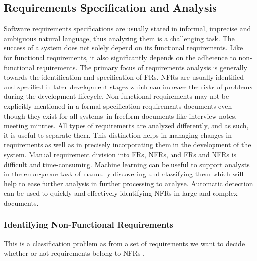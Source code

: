 \subsection{Requirements Specification and Analysis}

Software requirements specifications are usually stated in informal, imprecise and ambiguous natural language, thus analyzing them is a challenging task. 
The success of a system does not solely depend on its functional requirements.
Like for functional requirements, it also significantly depends on the adherence
to non-functional requirements. The primary focus of requirements analysis is
generally towards the identification and specification of FRs. NFRs are usually
identified and specified in later development stages which can increase the
risks of problems during the development lifecycle. Non-functional requirements may not be explicitly mentioned in a formal
specification requirements documents even though they exist for all
systems~\cite{Slankas:2013}in freeform documents like interview notes,
meeting minutes.
All types of requirements are analyzed differently, and as such, it is
useful to separate them. This distinction helps in managing changes in
requirements as well as in precisely incorporating them in the development of
the system. Manual requirement division into FRs, NFRs, and  FRs and NFRs is difficult and
time-consuming. 
Machine learning can be
useful to support analysts in the error-prone task of manually discovering and
classifying them which will help to ease further analysis in further processing to analyse. Automatic detection can be used to quickly and effectively
identifying NFRs in large and complex documents.

\subsubsection{Identifying Non-Functional Requirements}
This
is a classification problem as from a set of requirements we want to decide
whether or not requirements belong to NFRs . 

